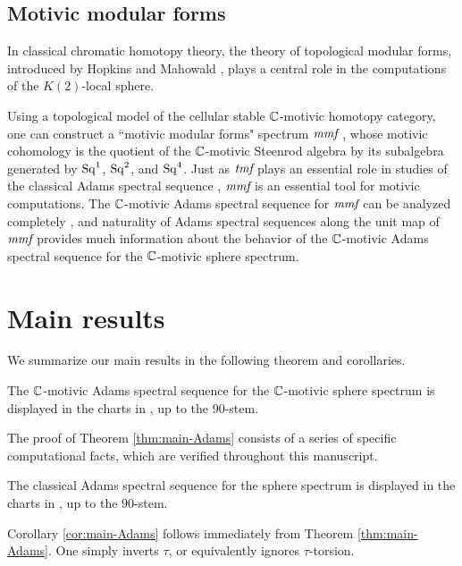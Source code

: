 \subsection{Motivic modular forms}

In classical chromatic homotopy theory, the theory of topological modular forms, introduced by Hopkins and Mahowald \cite{tmf14}, plays a central role in the computations of the $K(2)$-local sphere.

Using a topological model of the cellular stable $\mathbb{C}$-motivic homotopy category, 
one can construct a ``motivic modular forms" spectrum $\textit{mmf}$ \cite{GIKR18},
whose motivic cohomology is the quotient of the $\mathbb{C}$-motivic
Steenrod algebra by its subalgebra generated by
$\operatorname{Sq}^1$, $\operatorname{Sq}^2$, and $\operatorname{Sq}^4$.
Just as $\textit{tmf}$ plays an essential role in studies of the classical
Adams spectral sequence , $\textit{mmf}$ is an essential tool for
motivic computations.  The $\mathbb{C}$-motivic Adams spectral sequence
for $\textit{mmf}$ can be analyzed completely \cite{Isaksen18}, and naturality
of Adams spectral sequences along the unit map of $\textit{mmf}$
provides much information about the behavior of the $\mathbb{C}$-motivic
Adams spectral sequence for the $\mathbb{C}$-motivic sphere spectrum.


\section{Main results}

We summarize our main results in the following theorem and corollaries.

\begin{thm}
\label{thm:main-Adams}
The $\mathbb{C}$-motivic Adams spectral sequence for the $\mathbb{C}$-motivic sphere 
spectrum
is displayed in the charts in \cite{Isaksen14a}, up to the $90$-stem.
\end{thm}

The proof of Theorem \ref{thm:main-Adams} consists of a series of
specific computational facts, which are verified throughout this
manuscript.

\begin{cor}
\label{cor:main-Adams}
The classical Adams spectral sequence for the sphere spectrum is 
displayed in the charts in \cite{Isaksen14a}, up to the $90$-stem.
\end{cor}

Corollary \ref{cor:main-Adams} follows immediately from
Theorem \ref{thm:main-Adams}.  One simply inverts $\tau$, or equivalently
ignores $\tau$-torsion.

